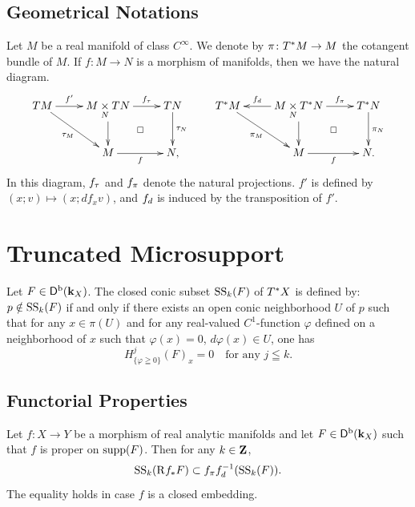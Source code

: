 \subsection*{Geometrical Notations}
Let \(M\) be a real manifold of class \(C^\infty\). 
We denote by \(\pi\colon \cotb[M] \to M\) 
the cotangent bundle of \(M\). 
If \(f\colon M\to N\) is a morphism of manifolds, 
then we have the natural diagram. 
\[\vcenter{\xymatrix{
  TM
    \ar[r]^-{f'}
    \ar[rd]_-{\tau_M} 
  &
  M\dpb[N]TN
    \ar[r]^-{\mptan[f]}
    \ar[d]
    \ar@{}[dr]|\square
  & 
  TN
    \ar[d]^-{\tau_N}
  &
  \cotb[M]
    \ar[rd]_-{\pi_M}
  &
  M\dpb[N]\cotb[N]
    \ar[l]_-{\mdiff[f]}
    \ar[r]^-{\mpb[f]}
    \ar[d]
    \ar@{}[dr]|\square
  &
  \cotb[N]
    \ar[d]^{\pi_N}
  \\
  &
  M
    \ar[r]_-{f}
  &
  N,
  &
  &
  M
    \ar[r]_-{f}
  &
  N.
}}\]
In this diagram, 
\(\mptan[f]\) and \(\mpb[f]\) denote 
the natural projections. \(f'\) is defined by 
\((x;v)\mapsto (x;df_{x}v)\), 
and \(\mdiff[f]\) is induced by the transposition of \(f'\). 

\section{Truncated Microsupport}

\begin{Definition+}
  Let \(F\in\Dompb(\kk_X)\). 
  The closed conic subset \(\muS[k](F)\) of \(\cotb[X]\) 
  is defined by: \(p\notin \muS[k](F)\) 
  if and only if 
  there exists an open conic neighborhood \(U\) of \(p\) 
  such that for any \(x\in \pi(U)\) and 
  for any real-valued \(C^{1}\)-function \(\varphi\) 
  defined on a neighborhood of \(x\) such that 
  \(\varphi(x)=0\), \(d\varphi(x)\in U\), 
  one has \begin{equation}
    H^{j}_{\{\varphi\geqq0\}}(F)_x=0
    \quad \text{for any \(j\leqq k\).}
  \end{equation}
\end{Definition+}

\subsection*{Functorial Properties} 
\begin{Proposition+}
  Let \(f\colon X\to Y\) be a morphism of real analytic manifolds and let \(F\in\Dompb(\kk_X)\) such that \(f\) is proper on \(\supp(F)\). 
  Then for any \(k\in\zz\), 
  \begin{equation}\label{eq:t-push}
    \muS[k](\Rder{f_{\ast}}F)\subset
    \mpb[f]\mdiff[f]^{-1}(\muS[k](F)).
  \end{equation}
  The equality holds in case \(f\) is a closed embedding.
\end{Proposition+}

